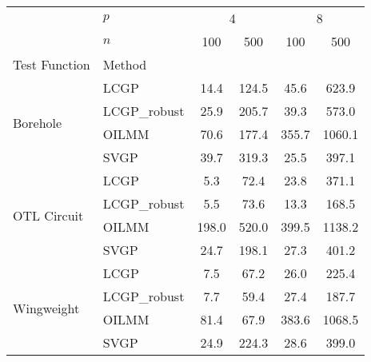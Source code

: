 \begin{tabular}{llcccc}
\hline
 &  $p$  & \multicolumn{2}{c}{4} & \multicolumn{2}{c}{8} \\
 & $n$ & 100 & 500 & 100 & 500 \\
Test Function &  Method  &  &  &  &  \\
\hline
\hline\multirow[c]{4}{*}{Borehole} & LCGP & 14.4 & 124.5 & 45.6 & 623.9 \\
 & LCGP\_robust & 25.9 & 205.7 & 39.3 & 573.0 \\
 & OILMM & 70.6 & 177.4 & 355.7 & 1060.1 \\
 & SVGP & 39.7 & 319.3 & 25.5 & 397.1 \\
\hline\multirow[c]{4}{*}{OTL Circuit} & LCGP & 5.3 & 72.4 & 23.8 & 371.1 \\
 & LCGP\_robust & 5.5 & 73.6 & 13.3 & 168.5 \\
 & OILMM & 198.0 & 520.0 & 399.5 & 1138.2 \\
 & SVGP & 24.7 & 198.1 & 27.3 & 401.2 \\
\hline\multirow[c]{4}{*}{Wingweight} & LCGP & 7.5 & 67.2 & 26.0 & 225.4 \\
 & LCGP\_robust & 7.7 & 59.4 & 27.4 & 187.7 \\
 & OILMM & 81.4 & 67.9 & 383.6 & 1068.5 \\
 & SVGP & 24.9 & 224.3 & 28.6 & 399.0 \\
\hline
\end{tabular}
